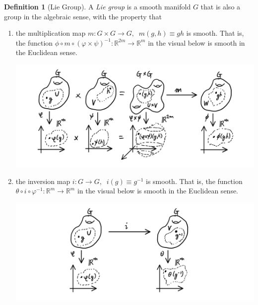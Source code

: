 \documentclass{article}
\theoremstyle{remark}
\theoremstyle{definition}
\newtheorem{definition}{Definition}[section]
\begin{document}
    \begin{definition}[Lie Group]
    A \textit{Lie group} is a smooth manifold $G$ that is also a group in the algebraic sense, with the property that 

    \begin{enumerate}
      \item the multiplication map $m: G \times G \longrightarrow G, \;\; m(g, h) \equiv g h$ is smooth. That is, the function $\phi \circ m \circ (\varphi \times \psi)^{-1}: \mathbb{R}^{2m} \longrightarrow \mathbb{R}^m$ in the visual below is smooth in the Euclidean sense.  

      \begin{center}
        \includegraphics[scale=0.28]{img/Lie_Group_Multiplication.PNG}
      \end{center}

      \item the inversion map $i: G \longrightarrow G, \;\; i(g) \equiv g^{-1}$ is smooth. That is, the function $\theta \circ i \circ \varphi^{-1}: \mathbb{R}^m \longrightarrow \mathbb{R}^m$ in the visual below is smooth in the Euclidean sense.  

      \begin{center}
        \includegraphics[scale=0.29]{img/Lie_Group_Inversion.PNG}
      \end{center}

    \end{enumerate}
    \end{definition}
\end{document}
